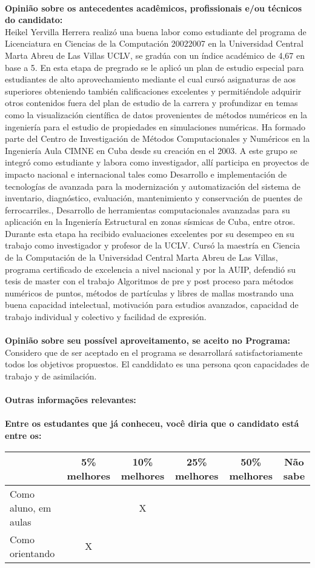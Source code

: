 \documentclass[11pt]{article}
\begin{document}
\\
\textbf{Opinião sobre os antecedentes acadêmicos, profissionais e/ou técnicos do candidato:}
\\Heikel Yervilla Herrera realizó una buena labor como estudiante del programa de Licenciatura en Ciencias de la Computación 20022007 en la Universidad Central Marta Abreu de Las Villas UCLV, se gradúa con un índice académico de 4,67 en base a 5. En esta etapa de pregrado se le aplicó un plan de estudio especial para estudiantes de alto aprovechamiento mediante el cual cursó asignaturas de aos superiores obteniendo también calificaciones excelentes y permitiéndole adquirir otros contenidos fuera del plan de estudio de la carrera y profundizar en temas como la visualización científica de datos provenientes de métodos numéricos en la ingeniería para el estudio de propiedades en simulaciones numéricas.
Ha formado parte del Centro de Investigación de Métodos Computacionales y Numéricos en la Ingeniería Aula CIMNE en Cuba desde su creación en el 2003. A este grupo se integró como estudiante y labora como investigador, allí participa en proyectos de impacto nacional e internacional tales como Desarrollo e implementación de tecnologías de avanzada para la modernización y automatización del sistema de inventario, diagnóstico, evaluación, mantenimiento y conservación de puentes de ferrocarriles., Desarrollo de herramientas computacionales avanzadas para su aplicación en la Ingeniería Estructural en zonas sísmicas de Cuba, entre otros. Durante esta etapa ha recibido evaluaciones excelentes por su desempeo en su trabajo como investigador y profesor de la UCLV.
Cursó la maestría en Ciencia de la Computación de la Universidad Central Marta Abreu de Las Villas, programa certificado de excelencia a nivel nacional y por la AUIP, defendió su tesis de master con el trabajo Algoritmos de pre y post proceso para métodos numéricos de puntos, métodos de partículas y libres de mallas mostrando una buena capacidad intelectual, motivación para estudios avanzados, capacidad de trabajo individual y colectivo y facilidad de expresión.
\\
\\
\textbf{Opinião sobre seu possível aproveitamento, se aceito no Programa:}
\\Considero que de ser aceptado en el programa se desarrollará satisfactoriamente todos los objetivos propuestos. El canddidato es una persona qcon capacidades de trabajo y de asimilación.\\ 
\\
\textbf{Outras informações relevantes:} \\
\\[0.3cm]
\textbf{Entre os estudantes que já conheceu, você diria que o candidato está entre os:}
\\
\begin{tabular}{|l|c|c|c|c|c|}
\hline
 & 5\% melhores & 10\% melhores & 25\% melhores & 50\% melhores & Não sabe \\
\hline
Como aluno, em aulas &  & X &  &  & \\
\hline
Como orientando & X &  &  &  & \\
\hline
\end{tabular}
\end{document}
